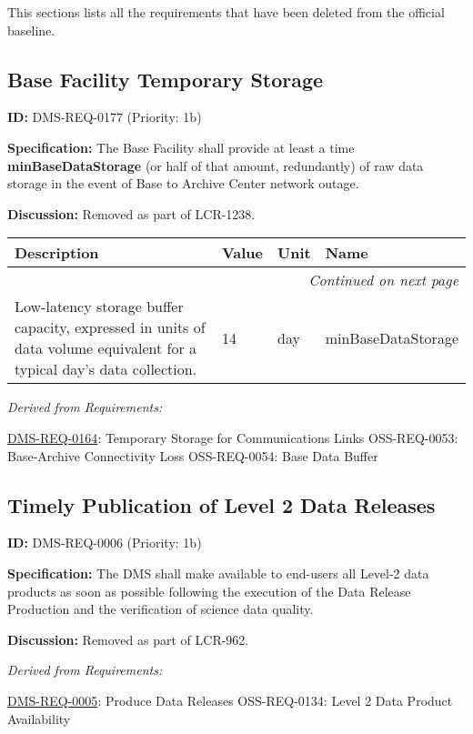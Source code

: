 \documentclass[SE,toc,lsstdraft]{lsstdoc}
\makeatletter
\newcommand{\paramname}[1]{\hspace{0pt}#1}
\newcommand{\unitname}[1]{\hspace{0pt}#1}
\newcommand{\addendum}{}
\newenvironment{parameters}[0]{%
\setlength\LTleft{0pt}
\setlength\LTright{\fill}
\begin{small}
\begin{longtable}[]{|p{0.49\textwidth}|l|p{0.6in}|p{1.70in}@{}|}

\hline \textbf{Description} & \textbf{Value} & \textbf{Unit} & \textbf{Name} \\ \hline
\endhead

\hline \multicolumn{4}{r}{\emph{Continued on next page}} \\
\endfoot

\hline\hline
\endlastfoot
}{%
\hline
\end{longtable}
\end{small}
}
\makeatother
\begin{document}
This sections lists all the requirements that have been deleted from the official baseline.

\subsection{Base Facility Temporary Storage}

\label{DMS-REQ-0177}
\textbf{ID:} DMS-REQ-0177 (Priority: 1b)

\textbf{Specification:}
    The Base Facility shall provide at least a time \textbf{minBaseDataStorage }(or half of that amount, redundantly) of raw data storage in the event of Base to Archive Center network outage.

\textbf{Discussion:}
Removed as part of LCR-1238.

\begin{parameters}
Low-latency storage buffer capacity, expressed in units of data volume equivalent for a typical day's data collection.
&
14
&
\unitname{%
day
}
&
\paramname{%
minBaseDataStorage
} \\\hline
\end{parameters}

\emph{Derived from Requirements:}

\hyperref[DMS-REQ-0164]{DMS-REQ-0164}:
Temporary Storage for Communications Links \newline
OSS-REQ-0053:
Base-Archive Connectivity Loss \newline
OSS-REQ-0054:
Base Data Buffer \newline

\subsection{Timely Publication of Level 2 Data Releases}

\label{DMS-REQ-0006}
\textbf{ID:} DMS-REQ-0006 (Priority: 1b)

\textbf{Specification:}
The DMS shall make available to end-users all Level-2 data products as soon as possible following the execution of the Data Release Production and the verification of science data quality.

\textbf{Discussion:}
Removed as part of LCR-962.

\emph{Derived from Requirements:}

\hyperref[DMS-REQ-0005]{DMS-REQ-0005}:
Produce Data Releases \newline
OSS-REQ-0134:
Level 2 Data Product Availability \newline

\addendum


\end{document}
